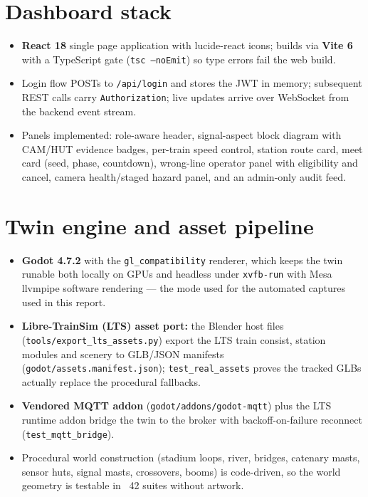 \section{Dashboard stack}

\begin{itemize}
  \item \textbf{React 18} single page application with lucide-react icons;
        builds via \textbf{Vite 6} with a TypeScript gate
        (\texttt{tsc --noEmit}) so type errors fail the web build.
  \item Login flow POSTs to \texttt{/api/login} and stores the JWT in
        memory; subsequent REST calls carry \texttt{Authorization};
        live updates arrive over WebSocket from the backend event stream.
  \item Panels implemented: role-aware header, signal-aspect block
        diagram with CAM/HUT evidence badges, per-train speed control,
        station route card, meet card (seed, phase, countdown), wrong-line
        operator panel with eligibility and cancel, camera health/staged
        hazard panel, and an admin-only audit feed.
\end{itemize}

\section{Twin engine and asset pipeline}

\begin{itemize}
  \item \textbf{Godot 4.7.2} with the \texttt{gl\_compatibility} renderer,
        which keeps the twin runable both locally on GPUs and headless
        under \texttt{xvfb-run} with Mesa llvmpipe software rendering ---
        the mode used for the automated captures used in this report.
  \item \textbf{Libre-TrainSim (LTS) asset port:} the Blender host files
        (\texttt{tools/export\_lts\_assets.py}) export the LTS train
        consist, station modules and scenery to GLB/JSON manifests
        (\texttt{godot/assets.manifest.json}); \texttt{test\_real\_assets}
        proves the tracked GLBs actually replace the procedural fallbacks.
  \item \textbf{Vendored MQTT addon} (\texttt{godot/addons/godot-mqtt})
        plus the LTS runtime addon bridge the twin to the broker with
        backoff-on-failure reconnect (\texttt{test\_mqtt\_bridge}).
  \item Procedural world construction (stadium loops, river, bridges,
        catenary masts, sensor huts, signal masts, crossovers, booms) is
        code-driven, so the world geometry is testable in ~42 suites
        without artwork.
\end{itemize}

